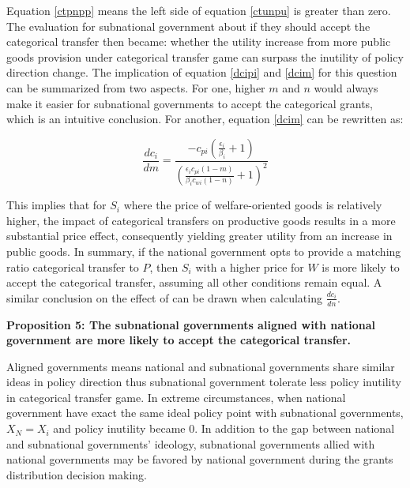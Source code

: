 \begin{itemize}
Equation \ref{ctpnpp} means the left side of equation \ref{ctunpu} is greater than zero. The evaluation for subnational government about if they should accept the categorical transfer then became: whether the utility increase from more public goods provision under categorical transfer game can surpass the inutility of policy direction change. The implication of equation \ref{dcipi} and \ref{dcim} for this question can be summarized from two aspects. For one, higher $m$ and $n$ would always make it easier for subnational governments to accept the categorical grants, which is an intuitive conclusion. For another, equation \ref{dcim} can be rewritten as:

\begin{equation}
  \frac{d c_i}{d m}= \frac{-c_{pi}(\frac{\epsilon_i}{\beta_i}+1)}{(\frac{\epsilon_ic_{pi}(1-m)}{\beta_ic_{wi}(1-n)}+1)^2}
\end{equation}

This implies that for $S_i$ where the price of welfare-oriented goods is relatively higher, the impact of categorical transfers on productive goods results in a more substantial price effect, consequently yielding greater utility from an increase in public goods. In summary, if the national government opts to provide a matching ratio categorical transfer to $P$, then $S_i$ with a higher price for $W$ is more likely to accept the categorical transfer, assuming all other conditions remain equal. A similar conclusion on the effect of can be drawn when calculating $\frac{dc_i}{dn}$.



\textbf{Proposition 5: The subnational governments aligned with national government are more likely to accept the categorical transfer.}

Aligned governments means national and subnational governments share similar ideas in policy direction thus subnational government tolerate less policy inutility in categorical transfer game. In extreme circumstances, when national government have exact the same ideal policy point with subnational governments, $X_N = X_i$ and policy inutility became 0. In addition to the gap between national and subnational governments' ideology, subnational governments allied with national governments may be favored by national government during the grants distribution decision making.


\end{itemize}
